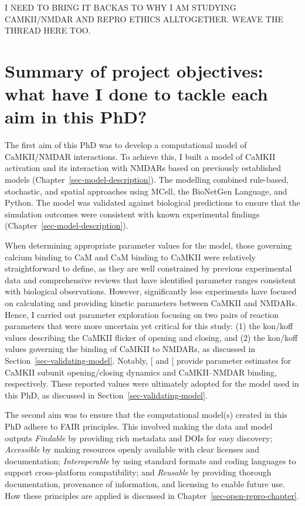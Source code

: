 \documentclass[
  11pt,
  letterpaper,
]{scrreprt}
\begin{document}
I NEED TO BRING IT BACKAS TO WHY I AM STUDYING CAMKII/NMDAR AND REPRO
ETHICS ALLTOGETHER. WEAVE THE THREAD HERE TOO.

\section{Summary of project objectives: what have I done to tackle each
aim in this
PhD?}\label{summary-of-project-objectives-what-have-i-done-to-tackle-each-aim-in-this-phd}

The first aim of this PhD was to develop a computational model of
CaMKII/NMDAR interactions. To achieve this, I built a model of CaMKII
activation and its interaction with NMDARs based on previously
established models (Chapter~\ref{sec-model-description}). The modelling
combined rule-based, stochastic, and spatial approaches using MCell, the
BioNetGen Language, and Python. The model was validated against
biological predictions to ensure that the simulation outcomes were
consistent with known experimental findings
(Chapter~\ref{sec-model-description}).

When determining appropriate parameter values for the model, those
governing calcium binding to CaM and CaM binding to CaMKII were
relatively straightforward to define, as they are well constrained by
previous experimental data and comprehensive reviews that have
identified parameter ranges consistent with biological observations.
However, significantly less experiments have focused on calculating and
providing kinetic parameters between CaMKII and NMDARs. Hence, I carried
out parameter exploration focusing on two pairs of reaction parameters
that were more uncertain yet critical for this study: (1) the kon/koff
values describing the CaMKII flicker of opening and closing, and (2) the
kon/koff values governing the binding of CaMKII to NMDARs, as discussed
in Section~\ref{sec-validating-model}. Notably,
{[}\citeproc{ref-pharris2019Multistate}{185}{]} and
{[}\citeproc{ref-leonard2002Regulation}{125}{]} provide parameter
estimates for CaMKII subunit opening/closing dynamics and CaMKII--NMDAR
binding, respectively. These reported values were ultimately adopted for
the model used in this PhD, as discussed in
Section~\ref{sec-validating-model}.

The second aim was to ensure that the computational model(s) created in
this PhD adhere to FAIR principles. This involved making the data and
model outputs \emph{Findable} by providing rich metadata and DOIs for
easy discovery; \emph{Accessible} by making resources openly available
with clear licenses and documentation; \emph{Interoperable} by using
standard formats and coding languages to support cross-platform
compatibility; and \emph{Reusable} by providing thorough documentation,
provenance of information, and licensing to enable future use. How these
principles are applied is discussed in
Chapter~\ref{sec-open-repro-chapter}.
\end{document}
